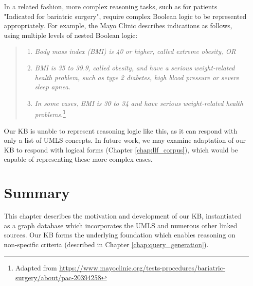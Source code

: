 \documentclass[../main.tex]{subfiles}
\begin{document}
In a related fashion, more complex reasoning tasks, such as for patients "Indicated for bariatric surgery", require complex Boolean logic to be represented appropriately. For example, the Mayo Clinic describes indications as follows, using multiple levels of nested Boolean logic:

\begin{quote}
    \begin{enumerate}
        \item \textit{Body mass index (BMI) is 40 or higher, called extreme obesity, OR}
        \item \textit{BMI is 35 to 39.9, called obesity, and have a serious weight-related health problem, such as type 2 diabetes, high blood pressure or severe sleep apnea.}
        \item \textit{In some cases, BMI is 30 to 34 and have serious weight-related health problems.}\footnote{Adapted from \url{https://www.mayoclinic.org/tests-procedures/bariatric-surgery/about/pac-20394258}}
    \end{enumerate}
\end{quote}

Our KB is unable to represent reasoning logic like this, as it can respond with only a list of UMLS concepts. In future work, we may examine adaptation of our KB to respond with logical forms (Chapter \ref{chap:llf_corpus}), which would be capable of representing these more complex cases.

\section{Summary}

This chapter describes the motivation and development of our KB, instantiated as a graph database which incorporates the UMLS and numerous other linked sources. Our KB forms the underlying foundation which enables reasoning on non-specific criteria (described in Chapter \ref{chap:query_generation}).
\end{document}
